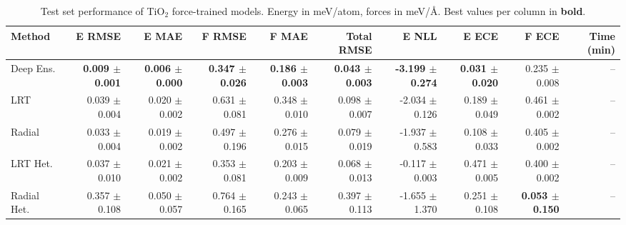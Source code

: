 \begin{table}
\centering
\caption{Test set performance of TiO$_2$ force-trained models. Energy in meV/atom, forces in meV/\AA{}. Best values per column in \textbf{bold}.}
\label{tab:tio2_results}
\begin{tabular}{lrrrrrrrrr}
\toprule
Method & E RMSE & E MAE & F RMSE & F MAE & Total RMSE & E NLL & E ECE & F ECE & Time (min) \\
\midrule
Deep Ens. & \textbf{0.009 $\pm$ 0.001} & \textbf{0.006 $\pm$ 0.000} & \textbf{0.347 $\pm$ 0.026} & \textbf{0.186 $\pm$ 0.003} & \textbf{0.043 $\pm$ 0.003} & \textbf{-3.199 $\pm$ 0.274} & \textbf{0.031 $\pm$ 0.020} & 0.235 $\pm$ 0.008 & -- \\
LRT & 0.039 $\pm$ 0.004 & 0.020 $\pm$ 0.002 & 0.631 $\pm$ 0.081 & 0.348 $\pm$ 0.010 & 0.098 $\pm$ 0.007 & -2.034 $\pm$ 0.126 & 0.189 $\pm$ 0.049 & 0.461 $\pm$ 0.002 & -- \\
Radial & 0.033 $\pm$ 0.004 & 0.019 $\pm$ 0.002 & 0.497 $\pm$ 0.196 & 0.276 $\pm$ 0.015 & 0.079 $\pm$ 0.019 & -1.937 $\pm$ 0.583 & 0.108 $\pm$ 0.033 & 0.405 $\pm$ 0.002 & -- \\
LRT Het. & 0.037 $\pm$ 0.010 & 0.021 $\pm$ 0.002 & 0.353 $\pm$ 0.081 & 0.203 $\pm$ 0.009 & 0.068 $\pm$ 0.013 & -0.117 $\pm$ 0.003 & 0.471 $\pm$ 0.005 & 0.400 $\pm$ 0.002 & -- \\
Radial Het. & 0.357 $\pm$ 0.108 & 0.050 $\pm$ 0.057 & 0.764 $\pm$ 0.165 & 0.243 $\pm$ 0.065 & 0.397 $\pm$ 0.113 & -1.655 $\pm$ 1.370 & 0.251 $\pm$ 0.108 & \textbf{0.053 $\pm$ 0.150} & -- \\
\bottomrule
\end{tabular}
\end{table}